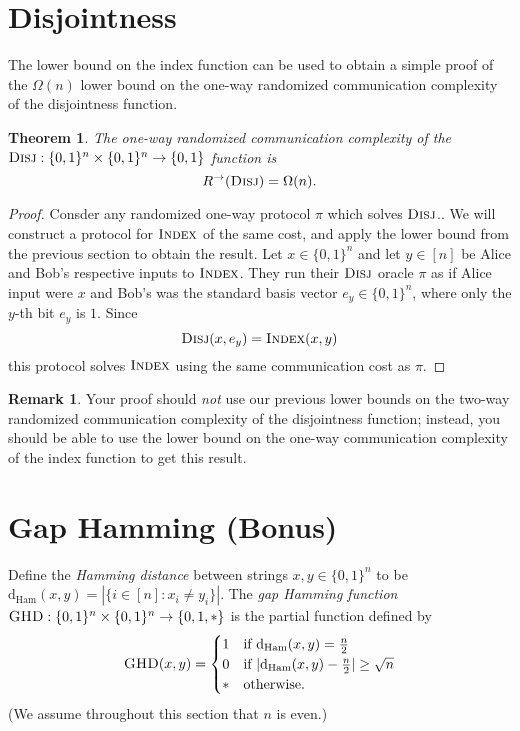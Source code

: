\documentclass[11pt]{amsart}
\theoremstyle{plain}
\newtheorem{theorem}{Theorem}
\theoremstyle{definition}
\newtheorem{remark}{Remark}
\theoremstyle{plain}
\newcommand{\dHam}{\mathrm{d}_{\mathrm{Ham}}}
\newcommand{\Disj}{\textsc{Disj}}
\newcommand{\GHD}{\textsc{GHD}}
\newcommand{\Index}{\textsc{Index}}
\begin{document}
\newpage 
\section{Disjointness}

The lower bound on the index function can be used to obtain a simple proof of the $\Omega(n)$ lower bound on the one-way randomized communication complexity of the disjointness function.

\begin{theorem}
The one-way randomized communication complexity of the $\Disj : \{0,1\}^n \times \{0,1\}^n \to \{0,1\}$ function is
\[
R^\rightarrow(\Disj) = \Omega(n).
\]
\end{theorem}

\begin{proof}
Consder any randomized one-way protocol $\pi$ which solves $\Disj$.. We will construct a protocol for $\Index$ of the same cost, and apply the lower bound from the previous section to obtain the result. Let $x \in \{0,1\}^n$ and let $y \in [n]$ be Alice and Bob's respective inputs to $\Index$. They run their $\Disj$ oracle $\pi$ as if Alice input were $x$ and Bob's was the standard basis vector $e_y\in\{0,1\}^n$, where only the $y$-th bit $e_y$ is $1$. Since
$$\Disj(x,e_y) = \Index(x,y)$$ 
this protocol solves $\Index$ using the same communication cost as $\pi$.
\end{proof}

\begin{remark}
Your proof should \emph{not} use our previous lower bounds on the two-way randomized communication complexity of the disjointness function; instead, you should be able to use the lower bound on the one-way communication complexity of the index function to get this result.
\end{remark}



\newpage 
\section{Gap Hamming (Bonus)}

Define the \emph{Hamming distance} between strings $x,y \in \{0,1\}^n$ to be $\dHam(x,y) = |\{i \in [n] : x_i \neq y_i\}|$.
The \emph{gap Hamming function} $\GHD : \{0,1\}^n \times \{0,1\}^n \to \{0,1,*\}$ is the partial function defined by
\[
\GHD(x,y) = \begin{cases}
1 & \mbox{if } \dHam(x,y) = \frac n2 \\
0 & \mbox{if } |\dHam(x,y) - \frac n2| \ge \sqrt{n} \\
* & \mbox{otherwise.}
\end{cases}
\] 
(We assume throughout this section that $n$ is even.)
\end{document}
